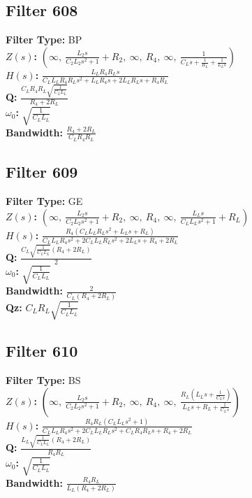 \documentclass{article}
\begin{document}
\subsection*{Filter 608}
\textbf{Filter Type:} BP \\ 
\textbf{$Z(s)$:} $\left( \infty, \  \frac{L_{2} s}{C_{2} L_{2} s^{2} + 1} + R_{2}, \  \infty, \  R_{4}, \  \infty, \  \frac{1}{C_{L} s + \frac{1}{R_{L}} + \frac{1}{L_{L} s}}\right)$ \\ 
\textbf{$H(s)$:} $\frac{L_{L} R_{4} R_{L} s}{C_{L} L_{L} R_{4} R_{L} s^{2} + L_{L} R_{4} s + 2 L_{L} R_{L} s + R_{4} R_{L}}$ \\ 
\textbf{Q:} $\frac{C_{L} R_{4} R_{L} \sqrt{\frac{1}{C_{L} L_{L}}}}{R_{4} + 2 R_{L}}$ \\ 
\textbf{$\omega_0$:} $\sqrt{\frac{1}{C_{L} L_{L}}}$ \\ 
\textbf{Bandwidth:} $\frac{R_{4} + 2 R_{L}}{C_{L} R_{4} R_{L}}$ \\ 
\subsection*{Filter 609}
\textbf{Filter Type:} GE \\ 
\textbf{$Z(s)$:} $\left( \infty, \  \frac{L_{2} s}{C_{2} L_{2} s^{2} + 1} + R_{2}, \  \infty, \  R_{4}, \  \infty, \  \frac{L_{L} s}{C_{L} L_{L} s^{2} + 1} + R_{L}\right)$ \\ 
\textbf{$H(s)$:} $\frac{R_{4} \left(C_{L} L_{L} R_{L} s^{2} + L_{L} s + R_{L}\right)}{C_{L} L_{L} R_{4} s^{2} + 2 C_{L} L_{L} R_{L} s^{2} + 2 L_{L} s + R_{4} + 2 R_{L}}$ \\ 
\textbf{Q:} $\frac{C_{L} \sqrt{\frac{1}{C_{L} L_{L}}} \left(R_{4} + 2 R_{L}\right)}{2}$ \\ 
\textbf{$\omega_0$:} $\sqrt{\frac{1}{C_{L} L_{L}}}$ \\ 
\textbf{Bandwidth:} $\frac{2}{C_{L} \left(R_{4} + 2 R_{L}\right)}$ \\ 
\textbf{Qz:} $C_{L} R_{L} \sqrt{\frac{1}{C_{L} L_{L}}}$ \\ 
\subsection*{Filter 610}
\textbf{Filter Type:} BS \\ 
\textbf{$Z(s)$:} $\left( \infty, \  \frac{L_{2} s}{C_{2} L_{2} s^{2} + 1} + R_{2}, \  \infty, \  R_{4}, \  \infty, \  \frac{R_{L} \left(L_{L} s + \frac{1}{C_{L} s}\right)}{L_{L} s + R_{L} + \frac{1}{C_{L} s}}\right)$ \\ 
\textbf{$H(s)$:} $\frac{R_{4} R_{L} \left(C_{L} L_{L} s^{2} + 1\right)}{C_{L} L_{L} R_{4} s^{2} + 2 C_{L} L_{L} R_{L} s^{2} + C_{L} R_{4} R_{L} s + R_{4} + 2 R_{L}}$ \\ 
\textbf{Q:} $\frac{L_{L} \sqrt{\frac{1}{C_{L} L_{L}}} \left(R_{4} + 2 R_{L}\right)}{R_{4} R_{L}}$ \\ 
\textbf{$\omega_0$:} $\sqrt{\frac{1}{C_{L} L_{L}}}$ \\ 
\textbf{Bandwidth:} $\frac{R_{4} R_{L}}{L_{L} \left(R_{4} + 2 R_{L}\right)}$ \\ 
\end{document}
